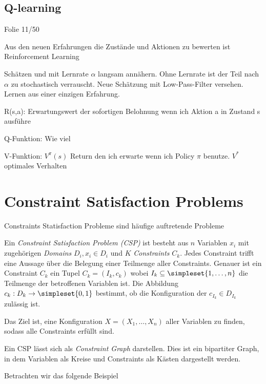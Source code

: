 \documentclass[ngerman]{../LaTeX-Templates/Paper/paper}
\begin{document}
\subsection{Q-learning} Folie 11/50



Aus den neuen Erfahrungen die Zustände und Aktionen zu bewerten ist Reinforcement Learning

Schätzen und mit Lernrate $\alpha$ langsam annähern. Ohne Lernrate ist der Teil nach $\alpha$ zu stochastisch verrauscht. Neue Schätzung mit Low-Pass-Filter versehen. Lernen aus einer einzigen Erfahrung.

R(s,a): Erwartungswert der sofortigen Belohnung wenn ich Aktion a in Zustand s ausführe

Q-Funktion: Wie viel 

V-Funktion: $V^\pi(s)$ Return den ich erwarte wenn ich Policy $\pi$ benutze. $V^\ast$ optimales Verhalten










\section{Constraint Satisfaction Problems}
Constraints Statisfaction Probleme sind häufige auftretende Probleme


\begin{definition}
	Ein \emph{Constraint Satisfaction Problem (CSP)} ist besteht aus $n$ Variablen $x_i$ mit zugehörigen \emph{Domains} $D_i, x_i\in D_i$ und $K$ \emph{Constraints} $C_k$.
	Jedes Constraint trifft eine Aussage über die Belegung einer Teilmenge aller Constraints. Genauer ist ein Constraint $C_k$ ein Tupel $C_k=(I_k,c_k)$ wobei $I_k\subseteq\simpleset{1,\ldots,n}$ die Teilmenge der betroffenen Variablen ist. Die Abbildung $c_k:D_k\rightarrow \simpleset{0,1}$ bestimmt, ob die Konfiguration der $c_{I_k}\in D_{I_k}$ zulässig ist.

	Das Ziel ist, eine Konfiguration $X=(X_1,\ldots,X_n)$ aller Variablen zu finden, sodass alle Constraints erfüllt sind.
\end{definition}


Ein CSP lässt sich als \emph{Constraint Graph} darstellen. Dies ist ein bipartiter Graph, in dem Variablen als Kreise und Constraints als Kästen dargestellt werden.

Betrachten wir das folgende Beispiel
\end{document}

